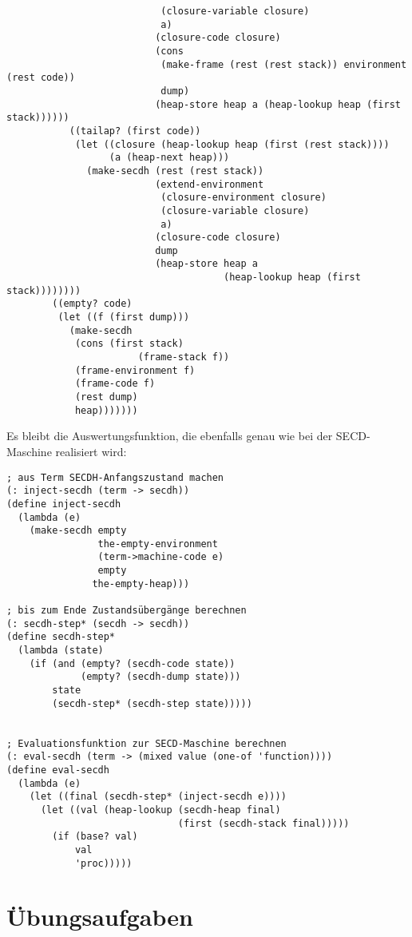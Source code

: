\begin{verbatim}
                           (closure-variable closure)
                           a)
                          (closure-code closure)
                          (cons
                           (make-frame (rest (rest stack)) environment (rest code))
                           dump)
                          (heap-store heap a (heap-lookup heap (first stack))))))
           ((tailap? (first code))
            (let ((closure (heap-lookup heap (first (rest stack))))
                  (a (heap-next heap)))
              (make-secdh (rest (rest stack))
                          (extend-environment
                           (closure-environment closure)
                           (closure-variable closure)
                           a)
                          (closure-code closure)
                          dump
                          (heap-store heap a
                                      (heap-lookup heap (first stack))))))))
        ((empty? code)
         (let ((f (first dump)))
           (make-secdh
            (cons (first stack)
                       (frame-stack f))
            (frame-environment f)
            (frame-code f)
            (rest dump)
            heap)))))))
\end{verbatim}    
%
Es bleibt die Auswertungsfunktion, die ebenfalls genau wie bei der
SECD-Maschine realisiert wird:
%
\begin{verbatim}
; aus Term SECDH-Anfangszustand machen
(: inject-secdh (term -> secdh))
(define inject-secdh
  (lambda (e)
    (make-secdh empty
                the-empty-environment
                (term->machine-code e)
                empty
               the-empty-heap)))

; bis zum Ende Zustandsübergänge berechnen
(: secdh-step* (secdh -> secdh))
(define secdh-step*
  (lambda (state)
    (if (and (empty? (secdh-code state))
             (empty? (secdh-dump state)))
        state
        (secdh-step* (secdh-step state)))))


; Evaluationsfunktion zur SECD-Maschine berechnen
(: eval-secdh (term -> (mixed value (one-of 'function))))
(define eval-secdh
  (lambda (e)
    (let ((final (secdh-step* (inject-secdh e))))
      (let ((val (heap-lookup (secdh-heap final)
                              (first (secdh-stack final)))))
        (if (base? val)
            val
            'proc)))))
\end{verbatim}


\section*{Übungsaufgaben}

